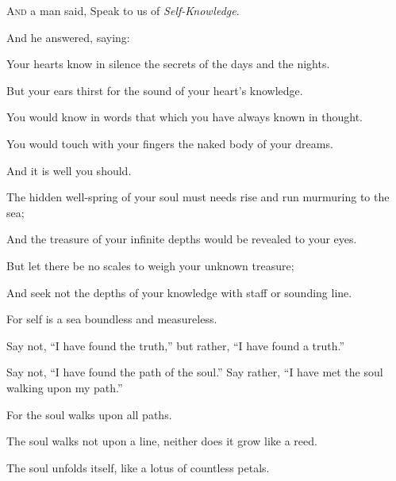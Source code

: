 \lettrine{A}{nd} a man said, Speak to us of
\textit{Self-Knowledge}.

\medskip
And he answered, saying:

Your hearts know in silence the secrets
of the days and the nights.

But your ears thirst for the sound of
your heart’s knowledge.

You would know in words that which you
have always known in thought.

You would touch with your fingers the
naked body of your dreams.

And it is well you should.

The hidden well-spring of your soul must
needs rise and run murmuring to the sea;

And the treasure of your infinite depths
would be revealed to your eyes.

But let there be no scales to weigh your
unknown treasure;

And seek not the depths of your
knowledge with staff or sounding
line.

For self is a sea boundless and
measureless.



Say not, \enquote{I have found the truth,} but
rather, \enquote{I have found a truth.}

Say not, \enquote{I have found the path of the
soul.} Say rather, \enquote{I have met the soul
walking upon my path.}

For the soul walks upon all paths.

The soul walks not upon a line, neither
does it grow like a reed.

The soul unfolds itself, like a lotus of
countless petals.